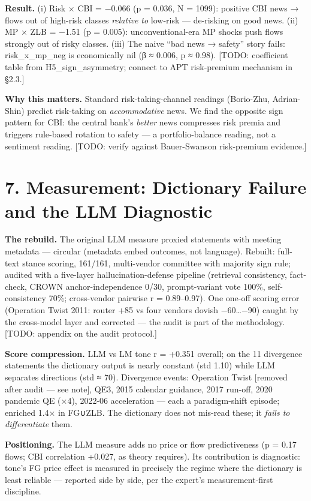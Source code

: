 \textbf{Result.} (i) Risk × CBI = −0.066 (p = 0.036, N = 1099): positive CBI news → flows out of high-risk classes \emph{relative to} low-risk --- de-risking on good news. (ii) MP × ZLB = −1.51 (p = 0.005): unconventional-era MP shocks push flows strongly out of risky classes. (iii) The naive ``bad news → safety'' story fails: risk\_x\_mp\_neg is economically nil (β ≈ 0.006, p ≈ 0.98). {[}TODO: coefficient table from H5\_sign\_asymmetry; connect to APT risk-premium mechanism in §2.3.{]}

\textbf{Why this matters.} Standard risk-taking-channel readings (Borio-Zhu, Adrian-Shin) predict risk-taking on \emph{accommodative} news. We find the opposite sign pattern for CBI: the central bank's \emph{better} news compresses risk premia and triggers rule-based rotation to safety --- a portfolio-balance reading, not a sentiment reading. {[}TODO: verify against Bauer-Swanson risk-premium evidence.{]}

\section{7. Measurement: Dictionary Failure and the LLM Diagnostic}\label{measurement-dictionary-failure-and-the-llm-diagnostic}

\textbf{The rebuild.} The original LLM measure proxied statements with meeting metadata --- circular (metadata embed outcomes, not language). Rebuilt: full-text stance scoring, 161/161, multi-vendor committee with majority sign rule; audited with a five-layer hallucination-defense pipeline (retrieval consistency, fact-check, CROWN anchor-independence 0/30, prompt-variant vote 100\%, self-consistency 70\%; cross-vendor pairwise r = 0.89--0.97). One one-off scoring error (Operation Twist 2011: router +85 vs four vendors dovish −60\ldots−90) caught by the cross-model layer and corrected --- the audit is part of the methodology. {[}TODO: appendix on the audit protocol.{]}

\textbf{Score compression.} LLM vs LM tone r = +0.351 overall; on the 11 divergence statements the dictionary output is nearly constant (std 1.10) while LLM separates directions (std ≈ 70). Divergence events: Operation Twist {[}removed after audit --- see note{]}, QE3, 2015 calendar guidance, 2017 run-off, 2020 pandemic QE (×4), 2022-06 acceleration --- each a paradigm-shift episode; enriched 1.4× in FG∪ZLB. The dictionary does not mis-read these; it \emph{fails to differentiate} them.

\textbf{Positioning.} The LLM measure adds no price or flow predictiveness (p = 0.17 flows; CBI correlation +0.027, as theory requires). Its contribution is diagnostic: tone's FG price effect is measured in precisely the regime where the dictionary is least reliable --- reported side by side, per the expert's measurement-first discipline.

